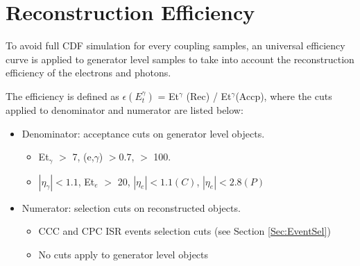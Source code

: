 \documentclass[12pt,twoside,letterpaper]{article}
\begin{document}
\section{Reconstruction Efficiency}

To avoid full CDF simulation for every coupling samples, an universal
efficiency curve is applied to generator level samples to take into
account the reconstruction efficiency of the electrons and photons. 

The efficiency is defined as
$\epsilon(E_t^{\gamma})$ =    Et$^{\gamma}$ (Rec) / Et$^{\gamma}$(Accp),
where the cuts applied to denominator and numerator are listed below: 
	\begin{itemize}
	   \item Denominator: acceptance cuts on generator level objects. 
	\begin{itemize}
	   \item Et$_{\gamma}$ $>$ 7, \DeltaR(e,$\gamma$) $>0.7$, \Meeg $>$ 100.  
	   \item $|\eta_{\gamma}| < 1.1$, Et$_{e}$ $>$ 20, $|\eta_{e}| < 1.1 (C)$, $|\eta_{e}| < 2.8 (P)$
	\end{itemize}
	   \item Numerator: selection cuts on reconstructed objects. 
	\begin{itemize}
	   \item CCC and CPC ISR \Zg events selection cuts (see
	   Section \ref{Sec:EventSel})
	   \item No cuts apply to generator level objects
	\end{itemize}
	\end{itemize}

\end{document}
